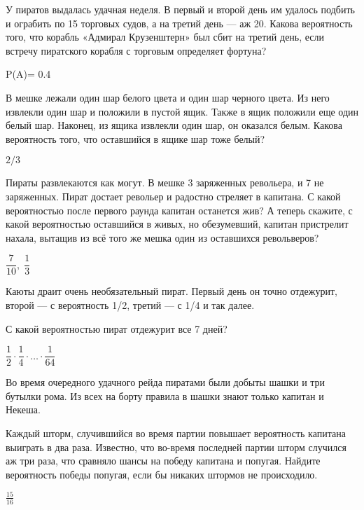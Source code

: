 \documentclass[12pt, addpoints, answers]{exam} %
\begin{document}
\begin{questions}


\question
У пиратов выдалась удачная неделя. В первый и второй день им удалось подбить и ограбить по 15 торговых судов, а на третий день --- аж 20. Какова вероятность того, что корабль «Адмирал Крузенштерн» был сбит на третий день, если встречу пиратского корабля с торговым определяет фортуна?
\begin{solution}
 P(A)= 0.4
\end{solution}


\question В мешке лежали один шар белого цвета и один шар черного цвета. Из него извлекли один шар и положили в пустой ящик. Также в ящик положили еще один белый шар. Наконец, из ящика извлекли один шар, он оказался белым. Какова вероятность того, что оставшийся в ящике шар тоже белый?
\begin{solution}
 $2/3$
\end{solution}

\question
Пираты развлекаются как могут. В мешке 3 заряженных револьера, и 7 не заряженных. Пират достает револьер и радостно стреляет в капитана. С какой вероятностью после первого раунда капитан останется жив?
А теперь скажите, с какой вероятностью оставшийся в живых, но обезумевший, капитан пристрелит нахала, вытащив из всё того же мешка один из оставшихся револьверов?
\begin{solution}
 $\dfrac{7}{10}, \; \dfrac13$
\end{solution}

\question
Каюты драит очень необязательный пират. Первый день он точно отдежурит, второй --- с вероятность 1/2, третий --- с 1/4 и так далее.

С какой вероятностью пират отдежурит все 7 дней?
\begin{solution}
 $\dfrac12\cdot\dfrac14\cdot \dots \cdot\dfrac{1}{64}$
\end{solution}



\question  Во время очередного удачного рейда пиратами были добыты шашки и три бутылки рома. Из всех на борту правила в шашки знают только капитан и Некеша.


Каждый шторм, случившийся во время партии повышает вероятность капитана выиграть в два раза. Известно, что во-время последней партии шторм случился аж три раза, что сравняло шансы на победу капитана и попугая. Найдите вероятность победы попугая, если бы никаких штормов не происходило.
\begin{solution}
 $\frac{15}{16}$
\end{solution}


\end{questions}
\end{document}
